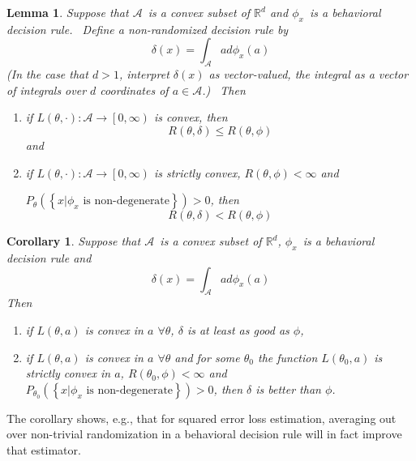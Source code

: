 \documentclass{article}
\newtheorem{corollary}[theorem]{Corollary}
\newtheorem{lemma}[theorem]{Lemma}
\begin{document}
\begin{lemma}
\label{convexrandom}Suppose that $\mathcal{A}$\ is a convex subset of $%
\mathbb{R}
^{d}$ and $\phi_{x}$\ is a behavioral decision rule. \ Define a non-randomized
decision rule by%
\[
\delta\left(  x\right)  =\int_{\mathcal{A}}ad\phi_{x}\left(  a\right)
\]
(In the case that $d>1$, interpret $\delta\left(  x\right)  $ as
vector-valued, the integral as a vector of integrals over $d$ coordinates of
$a\in\mathcal{A}$.) \ Then

\begin{enumerate}
\item if $L\left(  \theta,\cdot\right)  :\mathcal{A}\rightarrow\left[
0,\infty\right)  $ is convex, then%
\[
R\left(  \theta,\delta\right)  \leq R\left(  \theta,\phi\right)
\]
and

\item if $L\left(  \theta,\cdot\right)  :\mathcal{A}\rightarrow\left[
0,\infty\right)  $ is strictly convex, $R\left(  \theta,\phi\right)  <\infty$ and

$P_{\theta}\left(  \left\{  x|\phi_{x}\text{ is non-degenerate}\right\}
\right)  >0$, then%
\[
R\left(  \theta,\delta\right)  <R\left(  \theta,\phi\right)
\]

\end{enumerate}
\end{lemma}

\begin{corollary}
\label{convexrandom2}Suppose that $\mathcal{A}$\ is a convex subset of $%
\mathbb{R}
^{d}$, $\phi_{x}$\ is a behavioral decision rule and%
\[
\delta\left(  x\right)  =\int_{\mathcal{A}}ad\phi_{x}\left(  a\right)
\]
Then

\begin{enumerate}
\item if $L\left(  \theta,a\right)  $ is convex in $a$ $\forall\theta$,
$\delta$ is at least as good as $\phi$,

\item if $L\left(  \theta,a\right)  $ is convex in $a$ $\forall\theta$ and for
some $\theta_{0}$ the function $L\left(  \theta_{0},a\right)  $ is strictly
convex in $a$, $R\left(  \theta_{0},\phi\right)  <\infty$ and $P_{\theta_{0}%
}\left(  \left\{  x|\phi_{x}\text{ is non-degenerate}\right\}  \right)  >0$,
then $\delta$ is better than $\phi$.
\end{enumerate}
\end{corollary}

The corollary shows, e.g., that for squared error loss estimation, averaging
out over non-trivial randomization in a behavioral decision rule will in fact
improve that estimator.
\end{document}
